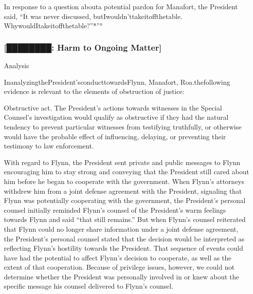 In response to a question abouta potential pardon for Manafort, the President said, “It was never discussed, butIwouldn'ttakeitoffthetable. WhywouldItakeitoffthetable?”*”°

\subsubsection{[████████: Harm to Ongoing Matter]}








Analysis

InanalyzingthePresident'sconducttowardsFlynn, Manafort, Roa.thefollowing evidence is relevant to the elements of obstruction of justice:

Obstructive act. The President's actions towards witnesses in the Special Counsel's investigation would qualify as obstructive if they had the natural tendency to prevent particular witnesses from testifying truthfully, or otherwise would have the probable effect of influencing, delaying, or preventing their testimony to law enforcement.

With regard to Flynn, the President sent private and public messages to Flynn encouraging him to stay strong and conveying that the President still cared about him before he began to cooperate with the government. When Flynn's attorneys withdrew him from a joint defense agreement with the President, signaling that Flynn was potentially cooperating with the government, the President's personal counsel initially reminded Flynn's counsel of the President's warm feelings towards Flynn and said “that still remains.” But when Flynn's counsel reiterated that Flynn could no longer share information under a joint defense agreement, the President's personal counsel stated that the decision would be interpreted as reflecting Flynn's hostility towards the President. That sequence of events could have had the potential to affect Flynn's decision to cooperate, as well as the extent of that cooperation. Because of privilege issues, however, we could not determine whether the President was personally involved in or knew about the specific message his counsel delivered to Flynn's counsel.

